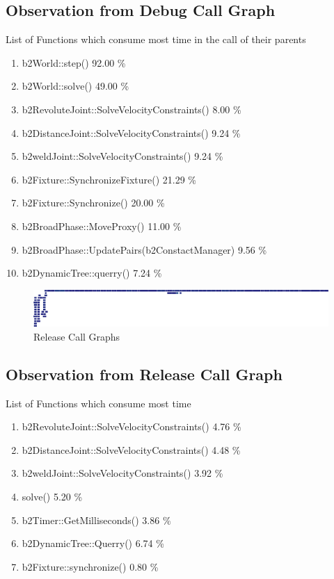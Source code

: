 \documentclass[11pt]{article}
\begin{document}
\subsection*{Observation from Debug Call Graph}
List of Functions which consume most time in the call of their parents
\begin{enumerate}
    \item b2World::step() 92.00 \%
    \item b2World::solve() 49.00 \%
    \item b2RevoluteJoint::SolveVelocityConstraints() 8.00 \%
    \item b2DistanceJoint::SolveVelocityConstraints() 9.24 \%
    \item b2weldJoint::SolveVelocityConstraints() 9.24 \%
    \item b2Fixture::SynchronizeFixture() 21.29 \%
    \item b2Fixture::Synchronize() 20.00 \%
    \item b2BroadPhase::MoveProxy() 11.00 \%
    \item b2BroadPhase::UpdatePairs(b2ConstactManager) 9.56 \%
    \item b2DynamicTree::querry() 7.24 \%
    
\end{enumerate}

\begin{figure}[h!]
	\centering
		\includegraphics[width=1\textwidth]{release.png}
			\caption{Release Call Graphs}
\end{figure}

\subsection*{Observation from Release Call Graph}
List of Functions which consume most time
\begin{enumerate}
    \item b2RevoluteJoint::SolveVelocityConstraints() 4.76 \%
    \item b2DistanceJoint::SolveVelocityConstraints() 4.48 \%
    \item b2weldJoint::SolveVelocityConstraints() 3.92 \%
    \item solve() 5.20 \%
    \item b2Timer::GetMilliseconds() 3.86 \%
    \item b2DynamicTree::Querry() 6.74 \%
    \item b2Fixture::synchronize() 0.80 \%
\end{enumerate}
\end{document}
